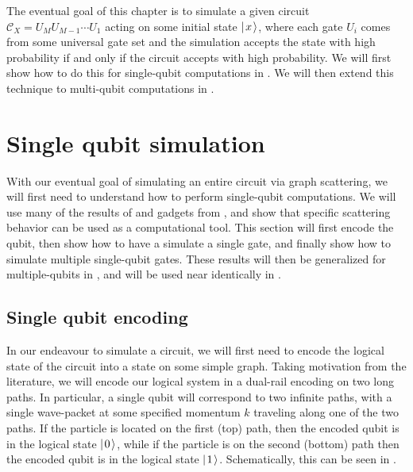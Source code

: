 \documentclass[../thesis-main/thesis-main]{subfiles}
\begin{document}
The eventual goal of this chapter is to simulate a given circuit $\mathcal{C}_X = U_{M} U_{M-1}\cdots U_1$ acting on some initial state $|\mspace{2mu} x \mspace{2mu} \rangle$, where each gate $U_i$ comes from some universal gate set and the simulation accepts the state with high probability if and only if the circuit accepts with high probability.  We will first show how to do this for single-qubit computations in .  We will then extend this technique to multi-qubit computations in .






\section{Single qubit simulation}\label{sec:SP_single_qubit_computations}

With our eventual goal of simulating an entire circuit via graph scattering, we will first need to understand how to perform single-qubit computations.  We will use many of the results of  and gadgets from , and show that specific scattering behavior can be used as a computational tool.  This section will first encode the qubit, then show how to have a simulate a single gate, and finally show how to simulate multiple single-qubit gates.   These results will then be generalized for multiple-qubits in , and will be used near identically in .


\subsection{Single qubit encoding}\label{sec:single_qubit_encoding}

In our endeavour to simulate a circuit, we will first need to encode the logical state of the circuit into a state on some simple graph.  Taking motivation from the literature, we will encode our logical system in a dual-rail encoding on two long paths.  In particular, a single qubit will correspond to two infinite paths, with a single wave-packet at some specified momentum $k$ traveling along one of the two paths.  If the particle is located on the first (top) path, then the encoded qubit is in the logical state $|\mspace{2mu} 0 \mspace{2mu} \rangle$, while if the particle is on the second (bottom) path then the encoded qubit is in the logical state $|\mspace{2mu} 1 \mspace{2mu} \rangle$.  Schematically, this can be seen in .
\end{document}
